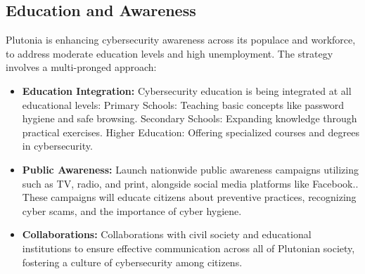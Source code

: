 \documentclass[
	a4paper, %
	10pt, %
]{CSSullivanBusinessReport}
\begin{document}
\begin{fullwidth}
\begin{justify}
\subsection{Education and Awareness}
Plutonia is enhancing cybersecurity awareness across its populace and workforce, to address moderate education levels and high unemployment. The strategy involves a multi-pronged approach:
\begin{itemize}
	\item \textbf{Education Integration:} Cybersecurity education is being integrated at all educational levels: Primary Schools: Teaching basic concepts like password hygiene and safe browsing. Secondary Schools: Expanding knowledge through practical exercises. Higher Education: Offering specialized courses and degrees in cybersecurity.
	\item \textbf{Public Awareness:} Launch nationwide public awareness campaigns utilizing such as TV, radio, and print, alongside social media platforms like Facebook.. These campaigns will educate citizens about preventive practices, recognizing cyber scams, and the importance of cyber hygiene.
	\item \textbf{Collaborations:} Collaborations with civil society and educational institutions to ensure effective communication across all of Plutonian society, fostering a culture of cybersecurity among citizens.
\end{itemize}

\end{justify}
\end{fullwidth}
\end{document}
